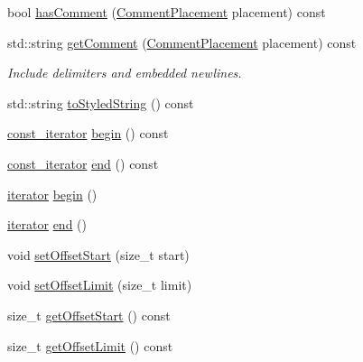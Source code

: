 \begin{DoxyCompactItemize}
bool \hyperlink{class_json_1_1_value_a06567a00363cab9601be7e31336db03a}{has\-Comment} (\hyperlink{namespace_json_a4fc417c23905b2ae9e2c47d197a45351}{Comment\-Placement} placement) const 
\item 
std\-::string \hyperlink{class_json_1_1_value_aa1e105b5d7f55d6e42f4fb2f3674116f}{get\-Comment} (\hyperlink{namespace_json_a4fc417c23905b2ae9e2c47d197a45351}{Comment\-Placement} placement) const 
\begin{DoxyCompactList}\small\item\em Include delimiters and embedded newlines. \end{DoxyCompactList}\item 
std\-::string \hyperlink{class_json_1_1_value_a05357cf78959b790337fae4e5580ee4f}{to\-Styled\-String} () const 
\item 
\hyperlink{class_json_1_1_value_af92282ca92b58b320debd486afb7696a}{const\-\_\-iterator} \hyperlink{class_json_1_1_value_ac12df0d6980600c5bac908ed0f64856e}{begin} () const 
\item 
\hyperlink{class_json_1_1_value_af92282ca92b58b320debd486afb7696a}{const\-\_\-iterator} \hyperlink{class_json_1_1_value_a596da1926b2f2a4056bff2edb713eb0b}{end} () const 
\item 
\hyperlink{class_json_1_1_value_a341cdf2e01f8b3c5b7317aa2f0768c53}{iterator} \hyperlink{class_json_1_1_value_a2d45bb2e68e8f22fe356d7d955ebd3c9}{begin} ()
\item 
\hyperlink{class_json_1_1_value_a341cdf2e01f8b3c5b7317aa2f0768c53}{iterator} \hyperlink{class_json_1_1_value_a2f961eff73f7f79cd29260b6cbd42558}{end} ()
\item 
void \hyperlink{class_json_1_1_value_a6d741407c3d784360c200f181b0d6d64}{set\-Offset\-Start} (size\-\_\-t start)
\item 
void \hyperlink{class_json_1_1_value_ac6d858b5fd4d5fe6ca84f697def8c5ea}{set\-Offset\-Limit} (size\-\_\-t limit)
\item 
size\-\_\-t \hyperlink{class_json_1_1_value_a10142eda11ae0b1caecbcc9f436854d1}{get\-Offset\-Start} () const 
\item 
size\-\_\-t \hyperlink{class_json_1_1_value_acd7114469bc39368e9d93c29b54d8c8f}{get\-Offset\-Limit} () const 
\end{DoxyCompactItemize}
